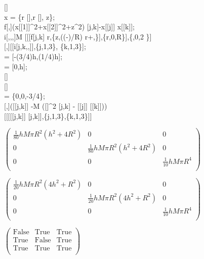 \documentclass{article}
\begin{document}
[]\\
x = \{r [\theta ],r [\theta ], z\};\\
f[,]\text{:=}(x[[1]]{}^{\wedge}2+x[[2]]{}^{\wedge}2+z{}^{\wedge}2) [j,k]-x[[j]] x[[k]];\\
i[,,,]\text{:=}M [[[f[j,k] r,\{z,((-)/R)
r+,\}],\{r,0,R\}],\{\theta ,0,2 \}]\\
[,]\text{:=}[[i[j,k,,]],\{j,1,3\}, \{k,1,3\}];\\
 = [-(3/4)h,(1/4)h];\\
 = [0,h];\\
[]\\
[]\\
 = \{0,0,-3/4\};\\
[,]\text{:=}([[j,k]] -M ([]{}^{\wedge}2 [j,k] - [[j]]
[[k]]))\\
[[[[[j,k]] \text{==} [j,k]],\{j,1,3\},\{k,1,3\}]]

\begin{doublespace}
\noindent\(\left(
\begin{array}{ccc}
 \frac{1}{80} h M \pi  R^2 \left(h^2+4 R^2\right) & 0 & 0 \\
 0 & \frac{1}{80} h M \pi  R^2 \left(h^2+4 R^2\right) & 0 \\
 0 & 0 & \frac{1}{10} h M \pi  R^4 \\
\end{array}
\right)\)
\end{doublespace}

\begin{doublespace}
\noindent\(\left(
\begin{array}{ccc}
 \frac{1}{20} h M \pi  R^2 \left(4 h^2+R^2\right) & 0 & 0 \\
 0 & \frac{1}{20} h M \pi  R^2 \left(4 h^2+R^2\right) & 0 \\
 0 & 0 & \frac{1}{10} h M \pi  R^4 \\
\end{array}
\right)\)
\end{doublespace}

\begin{doublespace}
\noindent\(\left(
\begin{array}{ccc}
 \text{False} & \text{True} & \text{True} \\
 \text{True} & \text{False} & \text{True} \\
 \text{True} & \text{True} & \text{True} \\
\end{array}
\right)\)
\end{doublespace}
\end{document}
